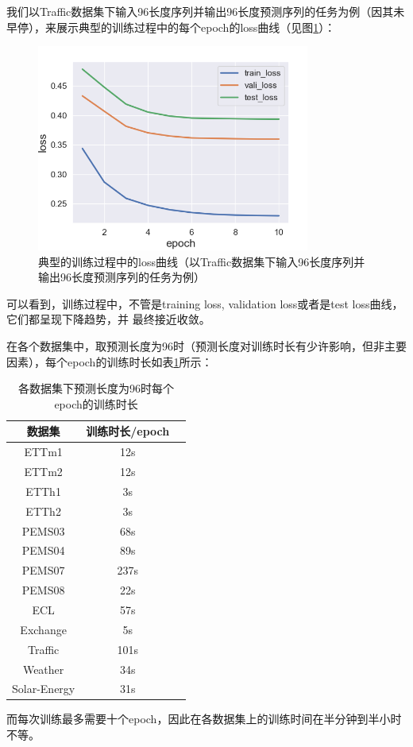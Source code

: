 \documentclass[twoside,12pt]{article}
\begin{document}
我们以Traffic数据集下输入96长度序列并输出96长度预测序列的任务为例（因其未早停），来展示典型的训练过程中的每个epoch的loss曲线（见图\ref{fig:loss}）：
\begin{figure}[htbp]
  \centering
  \includegraphics[width=0.8\textwidth]{./pic/loss_plot.png}
  \caption{典型的训练过程中的loss曲线（以Traffic数据集下输入96长度序列并输出96长度预测序列的任务为例）}
  \label{fig:loss}
\end{figure}

可以看到，训练过程中，不管是training loss, validation loss或者是test loss曲线，它们都呈现下降趋势，并 最终接近收敛。

在各个数据集中，取预测长度为96时（预测长度对训练时长有少许影响，但非主要因素），每个epoch的训练时长如表\ref{tab:time}所示：
\begin{table}[htbp]
  \caption{各数据集下预测长度为96时每个epoch的训练时长}
  \label{tab:time}
  \vspace{5pt}
  \centering
  \begin{tabular}{ccc}
    \toprule
    数据集       & 训练时长/epoch \\
    \midrule
    ETTm1        & 12s            \\
    ETTm2        & 12s            \\
    ETTh1        & 3s             \\
    ETTh2        & 3s             \\
    PEMS03       & 68s            \\
    PEMS04       & 89s            \\
    PEMS07       & 237s           \\
    PEMS08       & 22s            \\
    ECL          & 57s            \\
    Exchange     & 5s             \\
    Traffic      & 101s           \\
    Weather      & 34s            \\
    Solar-Energy & 31s            \\
    \bottomrule
  \end{tabular}
\end{table}
而每次训练最多需要十个epoch，因此在各数据集上的训练时间在半分钟到半小时不等。
\end{document}
